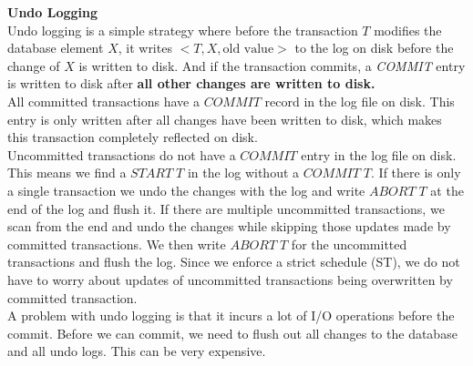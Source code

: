 \textbf{Undo Logging}\\
Undo logging is a simple strategy where before the transaction $T$ modifies the database element $X$, it writes $<T, X, \text{old value}>$ to the log on disk before the change of $X$ is written to disk. And if the transaction commits, a \textit{COMMIT} entry is written to disk after \textbf{all other changes are written to disk.}\\
All committed transactions have a $COMMIT$ record in the log file on disk. This entry is only written after all changes have been written to disk, which makes this transaction completely reflected on disk.\\
Uncommitted transactions do not have a $COMMIT$ entry in the log file on disk. This means we find a $START\;T$ in the log without a $COMMIT\;T$. If there is only a single transaction we undo the changes with the log and write $ABORT\;T$ at the end of the log and flush it. If there are multiple uncommitted transactions, we scan from the end and undo the changes while skipping those updates made by committed transactions. We then write $ABORT\;T$ for the uncommitted transactions and flush the log. Since we enforce a strict schedule (ST), we do not have to worry about updates of uncommitted transactions being overwritten by committed transaction.\vspace{.2cm}\\
A problem with undo logging is that it incurs a lot of I/O operations before the commit. Before we can commit, we need to flush out all changes to the database and all undo logs. This can be very expensive.\vspace{.3cm}\\

